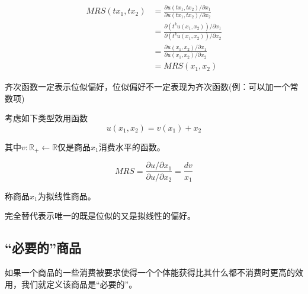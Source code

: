 \documentclass{article}
\begin{document}
\begin{equation*}
	\begin{split}
		MRS(tx_1,tx_2)&=\frac{\partial u(tx_1,tx_2)/\partial x_1}{\partial u(tx_1,tx_2)/\partial x_2}\\
		&=\frac{\partial (t^ku(x_1,x_2))/\partial x_1}{\partial (t^ku(x_1,x_2))/\partial x_2}\\
		&=\frac{\partial u(x_1,x_2)/\partial x_1}{\partial u(x_1,x_2)/\partial x_2}\\
		&=MRS(x_1,x_2 ) 
	\end{split}
\end{equation*}

齐次函数一定表示位似偏好，位似偏好不一定表现为齐次函数(例：可以加一个常数项)

\hspace*{\fill}

考虑如下类型效用函数
\[
u(x_1,x_2)=v(x_1)+x_2
\]

其中$ v:\mathbb{R}_+\leftarrow\mathbb{R} $仅是商品$ x_1 $消费水平的函数。

\[
MRS=\frac{\partial u/\partial x_1}{\partial u/\partial x_2}=\frac{dv}{x_1}
\]

称商品$ x_1 $为拟线性商品。

\hspace*{\fill}

完全替代表示唯一的既是位似的又是拟线性的偏好。

\subsection{“必要的”商品}
如果一个商品的一些消费被要求使得一个个体能获得比其什么都不消费时更高的效用，我们就定义该商品是“必要的”。
\end{document}
